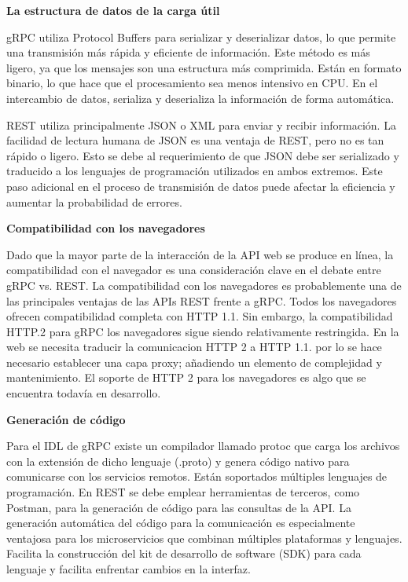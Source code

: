 \textbf{La estructura de datos de la carga útil}

gRPC utiliza Protocol Buffers para serializar y deserializar datos, lo que permite una transmisión más rápida y eficiente de información.
Este método es más ligero, ya que los mensajes son una estructura más comprimida.
Están en formato binario, lo que hace que el procesamiento sea menos intensivo en CPU. En el intercambio de datos, serializa y deserializa la información de forma automática.

REST utiliza principalmente JSON o XML para enviar y recibir información.
La facilidad de lectura humana de JSON es una ventaja de REST, pero no es tan rápido o ligero.
Esto se debe al requerimiento de que JSON debe ser serializado y traducido a los lenguajes de programación utilizados en ambos extremos.
Este paso adicional en el proceso de transmisión de datos puede afectar la eficiencia y aumentar la probabilidad de errores.


\textbf{Compatibilidad con los navegadores}\label{GRPCcompatibilidadConNavegadores}

Dado que la mayor parte de la interacción de la API web se produce en línea, la compatibilidad con el navegador es una consideración clave en el debate entre gRPC vs.
REST. La compatibilidad con los navegadores es probablemente una de las principales ventajas de las APIs REST frente a gRPC. Todos los navegadores ofrecen compatibilidad completa con HTTP 1.1. Sin embargo, la compatibilidad HTTP.2 para gRPC los navegadores sigue siendo relativamente restringida.
En la web se necesita traducir la comunicacion  HTTP 2 a HTTP 1.1. por lo se hace necesario establecer una capa proxy; añadiendo un elemento de complejidad y mantenimiento.
El soporte de HTTP 2 para los navegadores es algo que se encuentra todavía en desarrollo.

\textbf{Generación de código}

Para el IDL de gRPC existe un compilador llamado protoc que carga los archivos con la extensión de dicho lenguaje (.proto) y genera código nativo para comunicarse con los servicios remotos.
Están soportados múltiples lenguajes de programación.
En REST se debe emplear herramientas de terceros, como Postman, para la generación de código para las consultas de la API. La generación automática del código para la comunicación es especialmente ventajosa para los microservicios que combinan múltiples plataformas y lenguajes.
Facilita la construcción del kit de desarrollo de software (SDK) para cada lenguaje y facilita enfrentar cambios en la interfaz.

